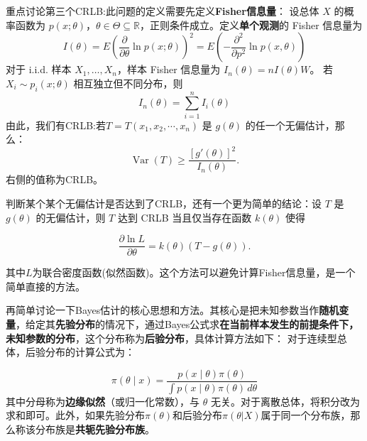 \documentclass[a4paper]{ctexart}
\begin{document}
重点讨论第三个CRLB:此问题的定义需要先定义\textbf{Fisher信息量}：
设总体 \(X\) 的概率函数为 \(p(x;\theta)\)，\(\theta \in \Theta \subseteq \mathbb{R}\)，正则条件成立。定义\textbf{单个观测}的 Fisher 信息量为
\begin{equation}
    I(\theta) = E\left( \frac{\partial}{\partial \theta} \ln p(x;\theta) \right)^2=E\left(-\dfrac{\partial^2}{\partial p^2} \ln p(x,\theta)\right)
\end{equation}
对于 i.i.d. 样本 \(X_1,\ldots,X_n\)，样本 Fisher 信息量为 \(I_n(\theta) = n I(\theta)W\)。
若 \(X_i \sim p_i(x;\theta)\) 相互独立但不同分布，则
\begin{equation}
    I_n(\theta) = \sum_{i=1}^n I_i(\theta)
\end{equation}
由此，我们有CRLB:若\( T = T(x_1, x_2, \cdots, x_n) \) 是 \( g(\theta) \) 的任一个无偏估计，那么：
\begin{equation}
    \operatorname{Var}(T) \geq \frac{[g'(\theta)]^2}{I_n(\theta)}.
\end{equation}
右侧的值称为CRLB。

\begin{tipbox}
    判断某个某个无偏估计是否达到了CRLB，还有一个更为简单的结论：设 \(T\) 是 \(g(\theta)\) 的无偏估计，则 \(T\) 达到 CRLB 当且仅当存在函数 \(k(\theta)\) 使得

    \begin{equation}
    \frac{\partial \ln L}{\partial \theta} = k(\theta)(T - g(\theta)).
    \end{equation}
    
    其中$L$为联合密度函数(似然函数)。这个方法可以避免计算Fisher信息量，是一个简单直接的方法。
\end{tipbox}

再简单讨论一下Bayes估计的核心思想和方法。其核心是把未知参数当作\textbf{随机变量}，给定其\textbf{先验分布}的情况下，通过Bayes公式求\textbf{在当前样本发生的前提条件下，未知参数的分布}，这个分布称为\textbf{后验分布}，具体计算方法如下：
对于连续型总体，后验分布的计算公式为：

\begin{equation}
    \pi(\theta \mid x) = \frac{p(x \mid \theta) \pi(\theta)}{\displaystyle\int p(x \mid \theta) \pi(\theta) \, d\theta}
\end{equation}
其中分母称为\textbf{边缘似然}（或归一化常数），与 \(\theta\) 无关。对于离散总体，将积分改为求和即可。此外，如果先验分布$\pi(\theta)$和后验分布$\pi(\theta|X)$属于同一个分布族，那么称该分布族是\textbf{共轭先验分布族}。
\end{document}
